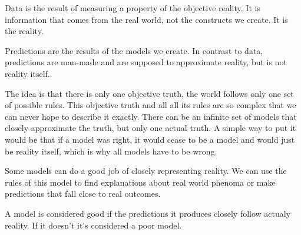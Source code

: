 \documentclass[12pt]{article}
\begin{document}

\begin{enumerate}



Data is the result of measuring a property of the objective reality. It is information that comes from the real world, not the constructs we create. It is the reality.


Predictions are the results of the models we create. In contrast to data, predictions are man-made and are supposed to approximate 
reality, but is not reality itself.


The idea is that there is only one objective truth, the world follows only one set of possible rules. This objective truth and all all its rules are so complex that we can never hope to describe it exactly. There can be an infinite set of models that closely approximate the truth, but only one actual truth. A simple way to put it would be that if a model was right, it would cease to be a model and would just be reality itself, which is why all models have to be wrong. 


Some models can do a good job of closely representing reality. We can use the rules of this model to find explanations about real world phenoma or make predictions that fall close to real outcomes.


A model is considered good if the predictions it produces closely follow actualy reality. If it doesn't it's considered a poor model.

\end{enumerate}
\end{document}
